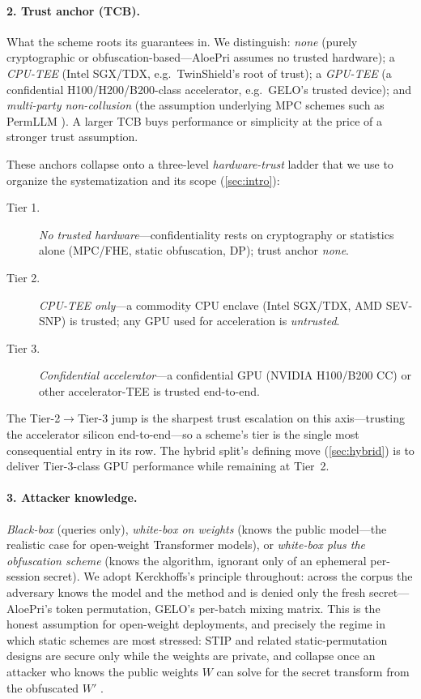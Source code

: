 \paragraph{2. Trust anchor (TCB).}
What the scheme roots its guarantees in. We distinguish: \emph{none} (purely
cryptographic or obfuscation-based---AloePri assumes no trusted hardware); a
\emph{CPU-TEE} (Intel SGX/TDX, e.g.\ TwinShield's root of trust); a
\emph{GPU-TEE} (a confidential H100/H200/B200-class accelerator, e.g.\ GELO's
trusted device); and \emph{multi-party non-collusion} (the assumption
underlying MPC schemes such as PermLLM \citep{permllm}). A larger TCB buys
performance or simplicity at the price of a stronger trust assumption.

These anchors collapse onto a three-level \emph{hardware-trust} ladder that we use to
organize the systematization and its scope (\cref{sec:intro}):
\begin{description}
  \item[Tier 1.] \emph{No trusted hardware}---confidentiality rests on cryptography or
        statistics alone (MPC/FHE, static obfuscation, DP); trust anchor \emph{none}.
  \item[Tier 2.] \emph{CPU-TEE only}---a commodity CPU enclave (Intel SGX/TDX, AMD
        SEV-SNP) is trusted; any GPU used for acceleration is \emph{untrusted}.
  \item[Tier 3.] \emph{Confidential accelerator}---a confidential GPU (NVIDIA H100/B200
        CC) or other accelerator-TEE is trusted end-to-end.
\end{description}
The Tier-2$\to$Tier-3 jump is the sharpest trust escalation on this axis---trusting the
accelerator silicon end-to-end---so a scheme's tier is the single most consequential
entry in its row. The hybrid split's defining move (\cref{sec:hybrid}) is to deliver
Tier-3-class GPU performance while remaining at Tier~2.

\paragraph{3. Attacker knowledge.}
\emph{Black-box} (queries only), \emph{white-box on weights} (knows the public
model---the realistic case for open-weight Transformer models), or \emph{white-box plus the
obfuscation scheme} (knows the algorithm, ignorant only of an ephemeral
per-session secret). We adopt Kerckhoffs's principle throughout: across the
corpus the adversary knows the model and the method and is denied only the
fresh secret---AloePri's token permutation, GELO's per-batch mixing matrix.
This is the honest assumption for open-weight deployments, and precisely the
regime in which static schemes are most stressed: STIP \citep{stip} and
related static-permutation designs are secure only while the weights are
private, and collapse once an attacker who knows the public weights $W$ can
solve for the secret transform from the obfuscated $W'$ \citep{belikov_gelo}.

